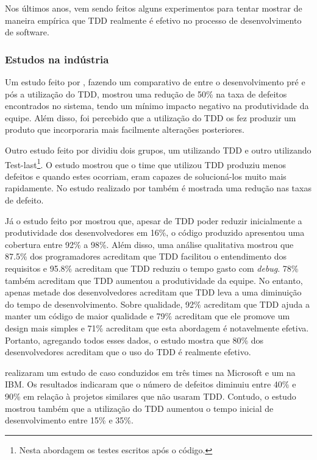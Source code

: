 Nos últimos anos, vem sendo feitos alguns experimentos para tentar mostrar de maneira empírica que TDD realmente é efetivo no processo de desenvolvimento de software.

\subsubsection{Estudos na indústria}
\label{sub:estudos_na_industria}

Um estudo feito por , fazendo um comparativo de entre o desenvolvimento pré e pós a utilização do TDD, mostrou uma redução de 50\% na taxa de defeitos encontrados no sistema, tendo um mínimo impacto negativo na produtividade da equipe. Além disso, foi percebido que a utilização do TDD os fez produzir um produto que incorporaria mais facilmente alterações posteriores.

Outro estudo feito por  dividiu dois grupos, um utilizando TDD e outro utilizando Test-last\footnote{Nesta abordagem os testes escritos após o código.}. O estudo mostrou que o time que utilizou TDD produziu menos defeitos e quando estes ocorriam, eram capazes de solucioná-los muito mais rapidamente. No estudo realizado por  também é mostrada uma redução nas taxas de defeito.

Já o estudo feito por  mostrou que, apesar de TDD poder reduzir inicialmente a produtividade dos desenvolvedores em 16\%, o código produzido apresentou uma cobertura entre 92\% a 98\%. Além disso, uma análise qualitativa mostrou que 87.5\% dos programadores acreditam que TDD facilitou o entendimento dos requisitos e 95.8\% acreditam que TDD reduziu o tempo gasto com \textit{debug}. 78\% também acreditam que TDD aumentou a produtividade da equipe. No entanto, apenas metade dos desenvolvedores acreditam que TDD leva a uma diminuição do tempo de desenvolvimento. Sobre qualidade, 92\% acreditam que TDD ajuda a manter um código de maior qualidade e 79\% acreditam que ele promove um design mais simples e 71\% acreditam que esta abordagem é notavelmente efetiva. Portanto, agregando todos esses dados, o estudo mostra que 80\% dos desenvolvedores acreditam que o uso do TDD é realmente efetivo.

 realizaram um estudo de caso conduzidos em três times na Microsoft e um na IBM. Os resultados indicaram que o número de defeitos diminuiu entre 40\% e 90\% em relação à projetos similares que não usaram TDD. Contudo, o estudo mostrou também que a utilização do TDD aumentou o tempo inicial de desenvolvimento entre 15\% e 35\%.



